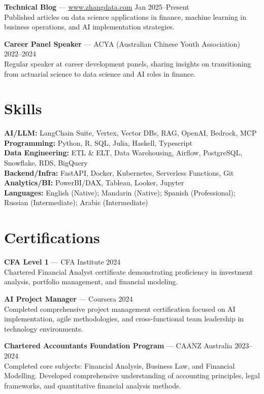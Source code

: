 \documentclass[10pt,letterpaper]{article}
\newcommand{\website}{https://www.zhangdata.com}
\begin{document}
\textbf{Technical Blog} — \href{\website}{www.zhangdata.com} \hfill Jan 2025--Present\\
Published articles on data science applications in finance, machine learning in business operations, and AI implementation strategies.

\textbf{Career Panel Speaker} — ACYA (Australian Chinese Youth Association) \hfill 2022--2024\\
Regular speaker at career development panels, sharing insights on transitioning from actuarial science to data science and AI roles in finance.

\section*{Skills}

\textbf{AI/LLM:} LangChain Suite, Vertex, Vector DBs, RAG, OpenAI, Bedrock, MCP\\
\textbf{Programming:} Python, R, SQL, Julia, Haskell, Typescript\\
\textbf{Data Engineering:} ETL \& ELT, Data Warehousing, Airflow, PostgreSQL, Snowflake, RDS, BigQuery\\
\textbf{Backend/Infra:} FastAPI, Docker, Kubernetes, Serverless Functions, Git\\
\textbf{Analytics/BI:} PowerBI/DAX, Tableau, Looker, Jupyter\\
\textbf{Languages:} English (Native); Mandarin (Native); Spanish (Professional); Russian (Intermediate); Arabic (Intermediate)

\section*{Certifications}

\textbf{CFA Level 1} — CFA Institute \hfill 2024\\
Chartered Financial Analyst certificate demonstrating proficiency in investment analysis, portfolio management, and financial modeling.

\textbf{AI Project Manager} — Coursera \hfill 2024\\
Completed comprehensive project management certification focused on AI implementation, agile methodologies, and cross-functional team leadership in technology environments.

\textbf{Chartered Accountants Foundation Program} — CAANZ Australia \hfill 2023--2024\\
Completed core subjects: Financial Analysis, Business Law, and Financial Modelling. Developed comprehensive understanding of accounting principles, legal frameworks, and quantitative financial analysis methods.
\end{document}
